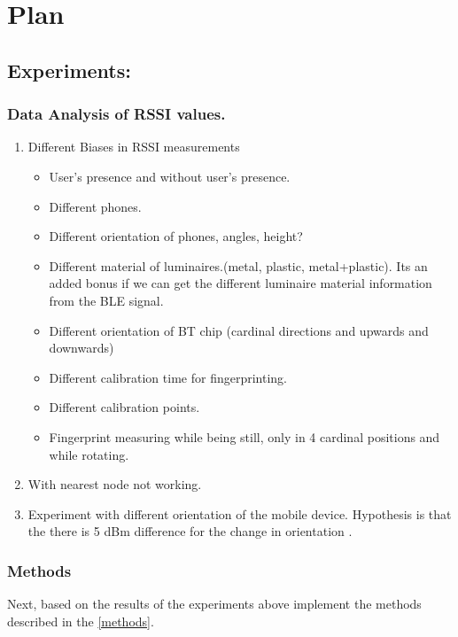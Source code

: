 \section{Plan}


\subsection{Experiments:} 

\subsubsection{Data Analysis of RSSI values.} \label{exp-rssi}
\begin{enumerate}
\item Different Biases in RSSI measurements
\begin{itemize}
\item User's presence and without user's presence.
\item Different phones.
\item Different orientation of phones, angles, height? 
\item Different material of luminaires.(metal, plastic, metal+plastic). Its an added bonus if we can get the different luminaire material information from the BLE signal.
\item Different orientation of BT chip (cardinal directions and upwards and downwards)
\item Different calibration time for fingerprinting.
\item Different calibration points.
\item Fingerprint measuring while being still, only in 4 cardinal positions and while rotating.
\end{itemize}
\item With nearest node not working.
\item Experiment with different orientation of the mobile device. Hypothesis is that the there is 5 dBm difference for the change in orientation \cite{kaemar}.
\end{enumerate}

\subsubsection{Methods} 
Next, based on the results of the experiments above implement the methods described in the \ref{methods}.


